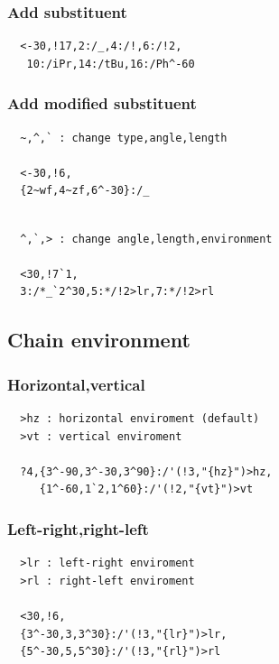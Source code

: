 \documentclass[a4paper]{article}
\makeatletter
\def\MCFstructure{\hspace{5mm}{\@strufont\char\fontnum}\advance\fontnum\@ne\relax}%
\makeatother
\begin{document}
\subsubsection{Add substituent}
\begin{verbatim}
  <-30,!17,2:/_,4:/!,6:/!2,
   10:/iPr,14:/tBu,16:/Ph^-60
\end{verbatim}
\MCFstructure
\subsubsection{Add modified substituent}
\begin{verbatim}
  ~,^,` : change type,angle,length

  <-30,!6,
  {2~wf,4~zf,6^-30}:/_
\end{verbatim}
\MCFstructure
\begin{verbatim}

  ^,`,> : change angle,length,environment

  <30,!7`1,
  3:/*_`2^30,5:*/!2>lr,7:*/!2>rl
\end{verbatim}
\MCFstructure
\subsection{Chain environment}
\subsubsection{Horizontal,vertical}
\begin{verbatim}
  >hz : horizontal enviroment (default)
  >vt : vertical enviroment

  ?4,{3^-90,3^-30,3^90}:/'(!3,"{hz}")>hz,
     {1^-60,1`2,1^60}:/'(!2,"{vt}")>vt
\end{verbatim}
\MCFstructure
\subsubsection{Left-right,right-left}
\begin{verbatim}
  >lr : left-right enviroment
  >rl : right-left enviroment

  <30,!6,
  {3^-30,3,3^30}:/'(!3,"{lr}")>lr,
  {5^-30,5,5^30}:/'(!3,"{rl}")>rl
\end{verbatim}
\MCFstructure
\end{document}
